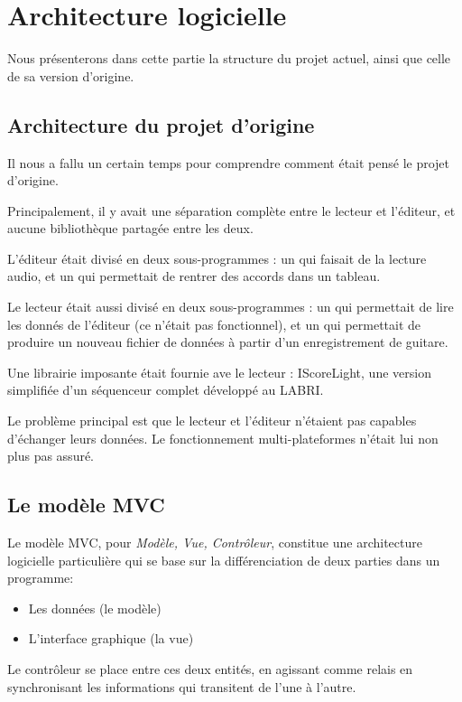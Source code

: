 \section{Architecture logicielle}

Nous présenterons dans cette partie la structure du projet actuel, ainsi que celle de sa version d'origine.

\subsection{Architecture du projet d'origine}

Il nous a fallu un certain temps pour comprendre comment était pensé le projet d'origine.

Principalement, il y avait une séparation complète entre le lecteur et l'éditeur, et aucune bibliothèque partagée entre les deux.

L'éditeur était divisé en deux sous-programmes : un qui faisait de la lecture audio, et un qui permettait de rentrer des accords dans un
tableau.

Le lecteur était aussi divisé en deux sous-programmes : un qui permettait de lire les donnés de l'éditeur (ce n'était pas fonctionnel),
et un qui permettait de produire un nouveau fichier de données à partir d'un enregistrement de guitare.

Une librairie imposante était fournie ave le lecteur : IScoreLight, une version simplifiée d'un séquenceur complet développé au \ac{LABRI}.

Le problème principal est que le lecteur et l'éditeur n'étaient pas capables d'échanger leurs données. Le fonctionnement multi-plateformes n'était lui non plus pas assuré.

\subsection{Le modèle MVC}

Le modèle MVC, pour \textit{Modèle, Vue, Contrôleur}, constitue une architecture logicielle particulière qui se base sur la différenciation de deux parties dans un programme:
\begin{itemize}
 \item Les données (le modèle)
 \item L'interface graphique (la vue)
\end{itemize}

Le contrôleur se place entre ces deux entités, en agissant comme relais en synchronisant les informations qui transitent de l'une à l'autre.

